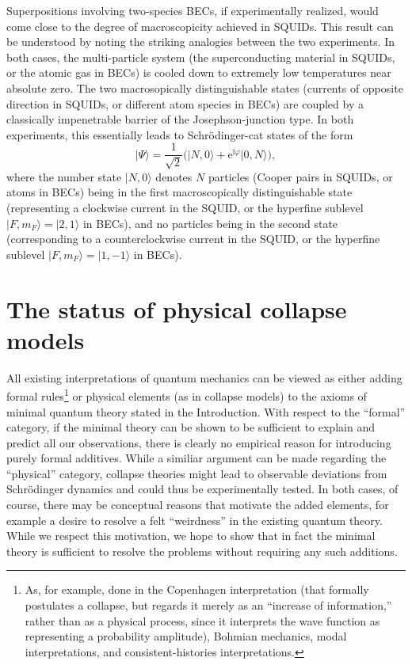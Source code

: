 \documentclass[12pt,aps,floatfix,amsmath,amssymb,showpacs,nofootinbib]{revtex4-2}
\newcommand{\be}{\begin{equation}} \newcommand{\ee}{\end{equation}}
\newcommand{\ket}[1]{\ensuremath{|{#1\rangle}}}
\newcommand{\e}{\ensuremath{\mathrm{e}}}
\begin{document}
Superpositions involving two-species BECs, if experimentally realized,
would come close to the degree of macroscopicity achieved in SQUIDs.
This result can be understood by noting the striking analogies between
the two experiments. In both cases, the multi-particle system (the
superconducting material in SQUIDs, or the atomic gas in BECs) is
cooled down to extremely low temperatures near absolute zero. The two
macrosopically distinguishable states (currents of opposite direction
in SQUIDs, or different atom species in BECs) are coupled by a
classically impenetrable barrier of the Josephson-junction type. In
both experiments, this essentially leads to Schr\"odinger-cat states
of the form
%
\be 
\ket{\Psi} = \frac{1}{\sqrt{2}} \bigl( \ket{N,0} + \e^{\mathrm{i}\varphi}
\ket{0,N} \bigr),
\ee 
%
where the number state $\ket{N,0}$ denotes $N$ particles (Cooper pairs
in SQUIDs, or atoms in BECs) being in the first macroscopically
distinguishable state (representing a clockwise current in the SQUID,
or the hyperfine sublevel $\ket{F,m_F} = \ket{2,1}$ in BECs), and no
particles being in the second state (corresponding to a
counterclockwise current in the SQUID, or the hyperfine sublevel
$\ket{F,m_F} = \ket{1,-1}$ in BECs).


\section{The status of physical collapse models}  \label{sec:physcoll}

All existing interpretations of quantum mechanics can be viewed as
either adding formal rules\footnote{As, for example, done in the
  Copenhagen interpretation (that formally postulates a collapse, but
  regards it merely as an ``increase of information,'' rather than as
  a physical process, since it interprets the wave function as
  representing a probability amplitude), Bohmian mechanics, modal
  interpretations, and consistent-histories interpretations.} or
physical elements (as in collapse models) to the axioms of minimal
quantum theory stated in the Introduction. With respect to the
``formal'' category, if the minimal theory can be shown to be
sufficient to explain and predict all our observations, there is
clearly no empirical reason for introducing purely formal additives.
While a similiar argument can be made regarding the ``physical''
category, collapse theories might lead to observable deviations from
Schr\"odinger dynamics and could thus be experimentally tested.  In
both cases, of course, there may be conceptual reasons that motivate
the added elements, for example a desire to resolve a felt
``weirdness'' in the existing quantum theory. While we respect this
motivation, we hope to show that in fact the minimal theory is
sufficient to resolve the problems without requiring any such
additions.
\end{document}
